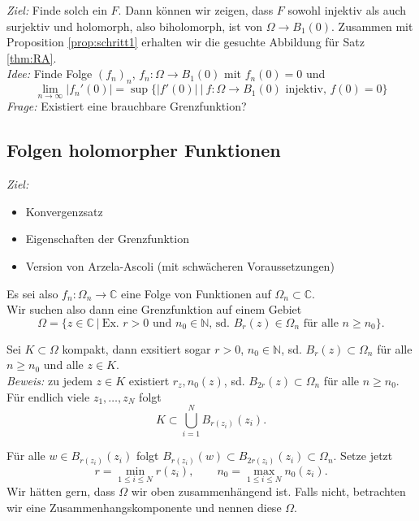 \documentclass[11pt,titlepage]{article}
\theoremstyle{definition}
\theoremstyle{remark}
\begin{document}
	\textsl{Ziel:} Finde solch ein $F$. Dann können wir zeigen, dass $F$ sowohl injektiv als auch surjektiv und 
	holomorph, also biholomorph, ist von $\Omega\to B_1(0)$. Zusammen mit Proposition \ref{prop:schritt1} erhalten 
	wir die gesuchte Abbildung für Satz \ref{thm:RA}. \\
	\textsl{Idee:} Finde Folge $(f_n)_n$, $f_n:\Omega\to B_1(0)$ mit $f_n(0)=0$ und
	\[ \lim_{n\to\infty} |f_n'(0)|=\sup \{ |f'(0)|\ \vert\ f:\Omega\to B_1(0)\text{ injektiv, } f(0)=0 \} \]
	\textsl{Frage:} Existiert eine brauchbare Grenzfunktion?
	
	\subsection{Folgen holomorpher Funktionen}
	
	\textsl{Ziel:} 
	\begin{itemize}
		\item Konvergenzsatz
		
		\item Eigenschaften der Grenzfunktion
		
		\item Version von Arzela-Ascoli (mit schwächeren Voraussetzungen)
	\end{itemize}
	Es sei also $f_n:\Omega_n\to\mathbb{C}$ eine Folge von Funktionen auf $\Omega_n\subset\mathbb{C}$. \\
	Wir suchen also dann eine Grenzfunktion auf einem Gebiet
	\[ \Omega = \{ z\in\mathbb{C}\ \vert\ \text{Ex. $r>0$ und $n_0\in\mathbb{N}$, sd. $B_r(z)\in\Omega_n$ für alle 
	$n\geq n_0$} \} .\]
	
	
	
	Sei $K\subset\Omega$ kompakt, dann exsitiert sogar $r>0$, $n_0\in\mathbb{N}$, sd. $B_r(z)\subset\Omega_n$ 
	für alle $n\geq n_0$ und alle $z\in K$. \\
	\textsl{Beweis:} zu jedem $z\in K$ existiert $r_z,n_0(z)$, sd. $B_{2r}(z)\subset\Omega_n$ für alle $n\geq n_0$. 
	Für endlich viele $z_1,\ldots,z_N$ folgt
	\[ K\subset \bigcup_{i=1}^N B_{r(z_i)}(z_i). \]
	
	
	
	
	Für alle $w\in B_{r(z_i)}(z_i)$ folgt $B_{r(z_i)}(w)\subset B_{2r(z_i)}(z_i)\subset \Omega_n$. Setze jetzt
	\[ r=\min_{1\leq i\leq N} r(z_i), \qquad n_0=\max_{1\leq i\leq N} n_0(z_i). \]
	Wir hätten gern, dass $\Omega$ wir oben zusammenhängend ist. Falls nicht, betrachten wir eine
	Zusammenhangskomponente und nennen diese $\Omega$.
	
\end{document}
